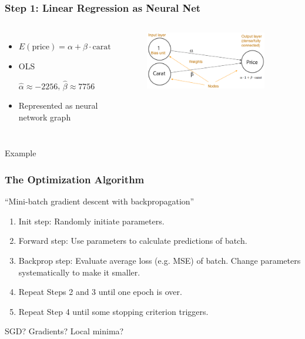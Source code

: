 \documentclass[
    utf8,
    aspectratio=169
]{beamer}  %
\begin{document}
\begin{frame}
	\frametitle{Step 1: Linear Regression as Neural Net}
	\begin{columns}
		\begin{itemize}
			\item $E(\text{price})=\alpha+\beta \cdot \text{carat}$
			\item OLS 
			
			$\hat\alpha \approx -2256$, $\hat\beta \approx 7756$
			\item Represented as neural network graph
		\end{itemize}
		\begin{figure}
		\includegraphics[width=0.9\textwidth]{pics/simple_nn.png}
	\end{figure}
	\end{columns}
	
	\vfill

	\begin{exampleblock}{\centering Example}
	\end{exampleblock}
\end{frame}

\begin{frame}
	\frametitle{The Optimization Algorithm}
	\begin{block}{``Mini-batch gradient descent with \alert{backpropagation}''}
		\begin{enumerate}
			\item Init step: Randomly initiate parameters.
			\item Forward step: Use parameters to calculate predictions of \alert{batch}.
			\item Backprop step: Evaluate \alert{average loss} (e.g. MSE) of batch. Change parameters systematically to make it smaller.
			\item Repeat Steps 2 and 3 until one \alert{epoch} is over.
			\item Repeat Step 4 until some stopping criterion triggers.
		\end{enumerate}
	\end{block}

	\vfill

	SGD? Gradients? Local minima?
\end{frame}
\end{document}
